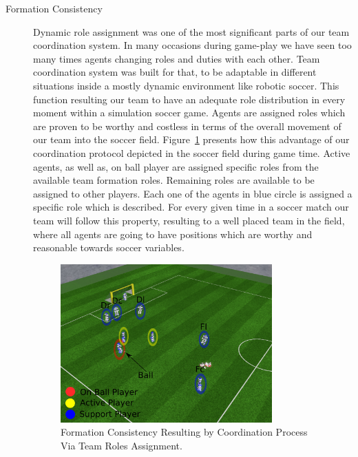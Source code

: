 \begin{description}
\item[Formation Consistency]
Dynamic role assignment was one of the most significant parts of our team coordination system. In many occasions during game-play we have seen too many times agents changing roles and duties with each other. Team coordination system was built for that, to be adaptable in different situations inside a mostly dynamic environment like robotic soccer. This function resulting our team to have an adequate role distribution in every moment within a simulation soccer game. Agents are assigned roles which are proven to be worthy and costless in terms of the overall movement of our team into the soccer field. Figure~\ref{fig:StrategicPositioning} presents how this advantage of our coordination protocol depicted in the soccer field during game time. Active agents, as well as, on ball player are assigned specific roles from the available team formation roles. Remaining roles are available to be assigned to other players. Each one of the agents in blue circle is assigned a specific role which is described. For every given time in a soccer match our team will follow this property, resulting to a well placed team in the field, where all agents are going to have positions which are worthy and reasonable towards soccer variables.

\begin{figure}[t!]
\centering
  \includegraphics[width=0.8\textwidth]{Chapter5/figures/4.pdf}
  \caption{Formation Consistency Resulting by Coordination Process Via Team Roles Assignment.} 
  \label{fig:StrategicPositioning}
\end{figure}

\end{description}

\clearpage



